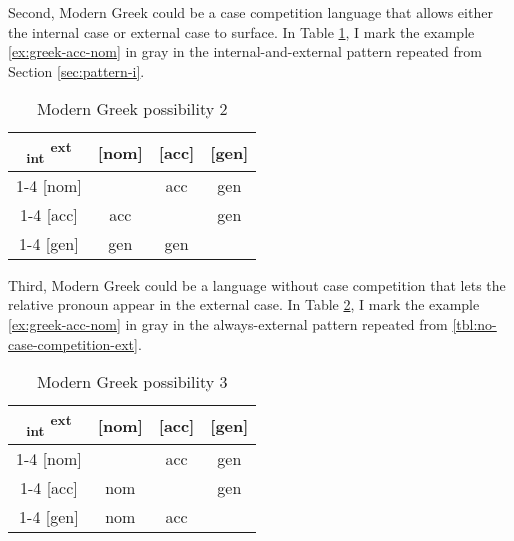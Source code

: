 Second, Modern Greek could be a case competition language that allows either the internal case or external case to surface. In Table \ref{tbl:greek-poss2}, I mark the example \ref{ex:greek-acc-nom} in gray in the internal-and-external pattern repeated from Section \ref{sec:pattern-i}.

  \begin{table}[H]
    \center
    \caption{Modern Greek possibility 2}
    \begin{tabular}{c|c|c|c}
      \toprule
      \textsubscript{\ac{int}} \textsuperscript{\ac{ext}}
             & [\ac{nom}]
             & [\ac{acc}]
             & [\ac{gen}]
             \\ \cmidrule{1-4}
         [\ac{nom}]
             & \xcancel{\phantom{xx}}
             & \cellcolor{LG}\ac{acc}
             & \ac{gen}
             \\ \cmidrule{1-4}
         [\ac{acc}]
             & \ac{acc}
             & \xcancel{\phantom{xx}}
             & \ac{gen}
             \\ \cmidrule{1-4}
         [\ac{gen}]
             & \ac{gen}
             & \ac{gen}
             & \xcancel{\phantom{xx}}
             \\
       \bottomrule
    \end{tabular}
      \label{tbl:greek-poss2}
  \end{table}

Third, Modern Greek could be a language without case competition that lets the relative pronoun appear in the external case. In Table \ref{tbl:greek-poss3}, I mark the example \ref{ex:greek-acc-nom} in gray in the always-external pattern repeated from \ref{tbl:no-case-competition-ext}.

 \begin{table}[H]
   \center
   \caption{Modern Greek possibility 3}
   \begin{tabular}{c|c|c|c}
     \toprule
    \textsubscript{\ac{int}} \textsuperscript{\ac{ext}}
           & [\ac{nom}]
           & [\ac{acc}]
           & [\ac{gen}]
           \\ \cmidrule{1-4}
       [\ac{nom}]
           & \xcancel{\phantom{xx}}
           & \cellcolor{LG}\ac{acc}
           & \ac{gen}
           \\ \cmidrule{1-4}
       [\ac{acc}]
           & \ac{nom}
           & \xcancel{\phantom{xx}}
           & \ac{gen}
           \\ \cmidrule{1-4}
       [\ac{gen}]
           & \ac{nom}
           & \ac{acc}
           & \xcancel{\phantom{xx}}
           \\
     \bottomrule
   \end{tabular}
   \label{tbl:greek-poss3}
 \end{table}

